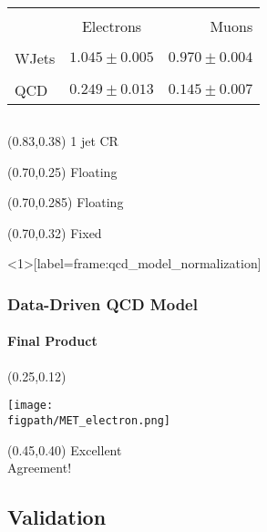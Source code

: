 \begin{frame}
\begin{columns}[T]
\begin{column}{0.48\textwidth}
\begin{table}[ht]
				\centering
				\scriptsize
				\begin{tabular}{| l | c | r |}
					\hline\hline\\[-2.7ex]
					& Electrons & Muons\\
					\hline\\[-2.7ex]
					WJets & $1.045\pm0.005$ & $0.970\pm0.004$\\
					\hline\\[-2.7ex]
					QCD & $0.249\pm0.013$ & $0.145\pm0.007$\\
					\hline
				\end{tabular}
				\label{tab:yields}
			\end{table}
		\end{column}
	\end{columns}
	\begin{textblock}{0.25}(0.83,0.38)
		1 jet CR
	\end{textblock}
	\begin{textblock}{0.25}(0.70,0.25)
		\color{red} Floating
	\end{textblock}
	\begin{textblock}{0.25}(0.70,0.285)
		\color{green} Floating
	\end{textblock}
	\begin{textblock}{0.25}(0.70,0.32)
		\color{blue} Fixed
	\end{textblock}
\end{frame}

\begin{frame}<1>[label=frame:qcd_model_normalization]
	\frametitle{Data-Driven QCD Model}
	\framesubtitle{Final Product}
	\vspace*{-0.24cm}
		\begin{textblock}{0.50}(0.25,0.12)
			\begin{center}
				\texttt{[image: \\figpath/MET\_electron.png]}
			\end{center}
		\end{textblock}
		\begin{textblock}{0.50}(0.45,0.40)
			{\color{orange}\Large Excellent\\Agreement!}
		\end{textblock}
\end{frame}


\subsection*{Validation}

